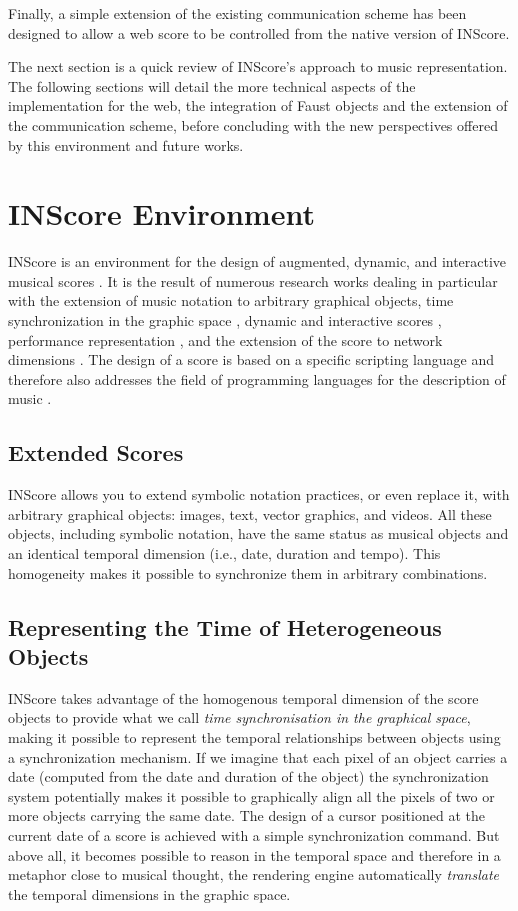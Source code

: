 \documentclass{article}
\begin{document}
Finally, a simple extension of the existing communication scheme has been designed to allow a web score to be controlled from the native version of INScore.

The next section is a quick review of INScore's approach to music representation. The following sections will detail the more technical aspects of the implementation for the web, the integration of Faust objects and the extension of the communication scheme, before concluding with the new perspectives offered by this environment and future works.


\section{INScore Environment}\label{sec:inscore}

INScore is an environment for the design of augmented, dynamic, and interactive musical scores \cite{Fober:12a}. It is the result of numerous research works dealing in particular with the extension of music notation to arbitrary graphical objects, time synchronization in the graphic space \cite{fober:hal-02158957}, dynamic and interactive scores \cite{fober:hal-00851956}, performance representation \cite{fober:hal-02158968}, and the extension of the score to network dimensions \cite{Fober:15b}.
The design of a score is based on a specific scripting language and therefore also addresses the field of programming languages for the description of music \cite{fober:hal-02368958}. 

\subsection{Extended Scores}
INScore allows you to extend symbolic notation practices, or even replace it, with arbitrary graphical objects: images, text, vector graphics, and videos. All these objects, including symbolic notation, have the same status as musical objects and an identical temporal dimension (i.e., date, duration and tempo). This homogeneity makes it possible to synchronize them in arbitrary combinations.

\subsection{Representing the Time of Heterogeneous Objects}
INScore takes advantage of the homogenous temporal dimension of the score objects to provide what we call \emph{time synchronisation in the graphical space}, making it possible to represent the temporal relationships between objects using a synchronization mechanism. If we imagine that each pixel of an object carries a date (computed from the date and duration of the object) the synchronization system potentially makes it possible to graphically align all the pixels of two or more objects carrying the same date. The design of a cursor positioned at the current date of a score is achieved with a simple synchronization command. But above all, it becomes possible to reason in the temporal space and therefore in a metaphor close to musical thought, the rendering engine automatically \emph{translate} the temporal dimensions in the graphic space.
\end{document}
